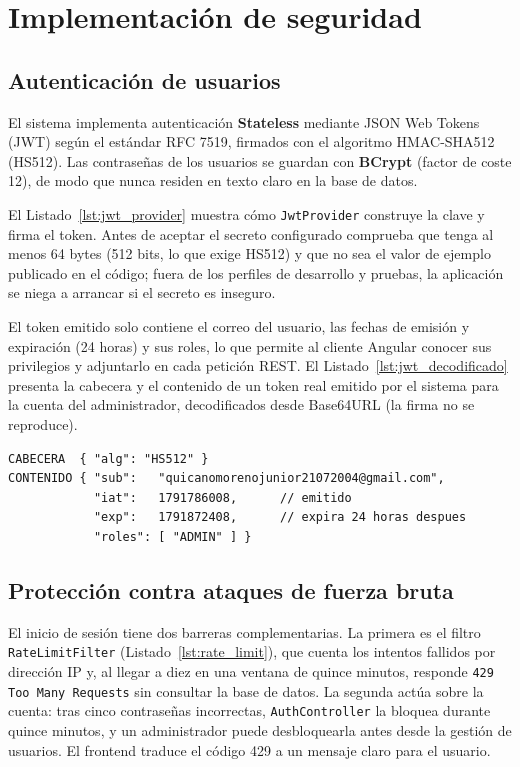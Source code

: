\documentclass[11pt,a4paper]{report}
\newcommand{\codigoreal}[6]{%
  }
\begin{document}
\section{Implementación de seguridad}
\subsection{Autenticación de usuarios}
El sistema implementa autenticación \textbf{Stateless} mediante JSON Web Tokens (JWT) según el estándar RFC 7519, firmados con el algoritmo HMAC-SHA512 (HS512). Las contraseñas de los usuarios se guardan con \textbf{BCrypt} (factor de coste 12), de modo que nunca residen en texto claro en la base de datos.

El Listado~\ref{lst:jwt_provider} muestra cómo \texttt{JwtProvider} construye la clave y firma el token. Antes de aceptar el secreto configurado comprueba que tenga al menos 64 bytes (512 bits, lo que exige HS512) y que no sea el valor de ejemplo publicado en el código; fuera de los perfiles de desarrollo y pruebas, la aplicación se niega a arrancar si el secreto es inseguro.

\codigoreal{codigo/JwtProvider.java}{68}{127}{Java}{Construcción de la clave HS512 y emisión del token en JwtProvider.java}{lst:jwt_provider}

El token emitido solo contiene el correo del usuario, las fechas de emisión y expiración (24 horas) y sus roles, lo que permite al cliente Angular conocer sus privilegios y adjuntarlo en cada petición REST. El Listado~\ref{lst:jwt_decodificado} presenta la cabecera y el contenido de un token real emitido por el sistema para la cuenta del administrador, decodificados desde Base64URL (la firma no se reproduce).

\begin{lstlisting}[style=codigoreal, numbers=none, caption={Cabecera y contenido decodificados de un token JWT emitido por el sistema}, label={lst:jwt_decodificado}]
CABECERA  { "alg": "HS512" }
CONTENIDO { "sub":   "quicanomorenojunior21072004@gmail.com",
            "iat":   1791786008,      // emitido
            "exp":   1791872408,      // expira 24 horas despues
            "roles": [ "ADMIN" ] }
\end{lstlisting}

\subsection{Protección contra ataques de fuerza bruta}
El inicio de sesión tiene dos barreras complementarias. La primera es el filtro \texttt{RateLimitFilter} (Listado~\ref{lst:rate_limit}), que cuenta los intentos fallidos por dirección IP y, al llegar a diez en una ventana de quince minutos, responde \texttt{429 Too Many Requests} sin consultar la base de datos. La segunda actúa sobre la cuenta: tras cinco contraseñas incorrectas, \texttt{AuthController} la bloquea durante quince minutos, y un administrador puede desbloquearla antes desde la gestión de usuarios. El frontend traduce el código 429 a un mensaje claro para el usuario.
\end{document}
